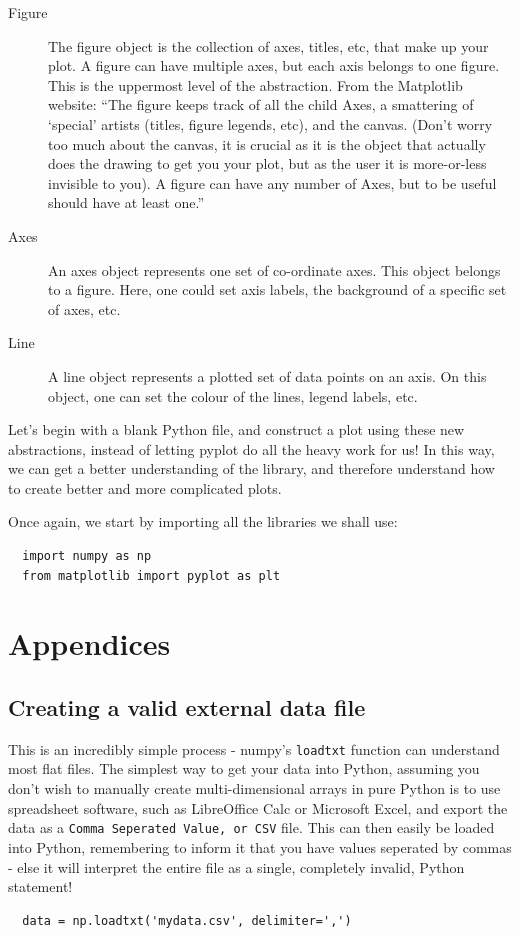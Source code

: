 \documentclass{article}
\begin{document}
\begin{description}
\item [Figure] The figure object is the collection of axes, titles,
  etc, that make up your plot. A figure can have multiple axes, but
  each axis belongs to one figure. This is the uppermost level of the
  abstraction. From the Matplotlib website: ``The figure keeps track
  of all the child Axes, a smattering of ‘special’ artists (titles,
  figure legends, etc), and the canvas. (Don’t worry too much about
  the canvas, it is crucial as it is the object that actually does the
  drawing to get you your plot, but as the user it is more-or-less
  invisible to you). A figure can have any number of Axes, but to be
  useful should have at least one.''
\item [Axes] An axes object represents one set of co-ordinate
  axes. This object belongs to a figure. Here, one could set axis
  labels, the background of a specific set of axes, etc.
\item [Line] A line object represents a plotted set of data points on
  an axis. On this object, one can set the colour of the lines, legend
  labels, etc.
\end{description}

Let's begin with a blank Python file, and construct a plot using these
new abstractions, instead of letting pyplot do all the heavy work for
us! In this way, we can get a better understanding of the library, and
therefore understand how to create better and more complicated plots.

Once again, we start by importing all the libraries we shall use:

\begin{lstlisting}
  import numpy as np
  from matplotlib import pyplot as plt
\end{lstlisting}

\section{Appendices}
\subsection{Creating a valid external data file}
This is an incredibly simple process - numpy's \texttt{loadtxt}
function can understand most flat files. The simplest way to get your
data into Python, assuming you don't wish to manually create
multi-dimensional arrays in pure Python is to use spreadsheet
software, such as LibreOffice Calc or Microsoft Excel, and export the
data as a \texttt{Comma Seperated Value, or CSV} file. This can then
easily be loaded into Python, remembering to inform it that you have
values seperated by commas - else it will interpret the entire file as
a single, completely invalid, Python statement!

\begin{lstlisting}
  data = np.loadtxt('mydata.csv', delimiter=',') 
\end{lstlisting}
\end{document}
